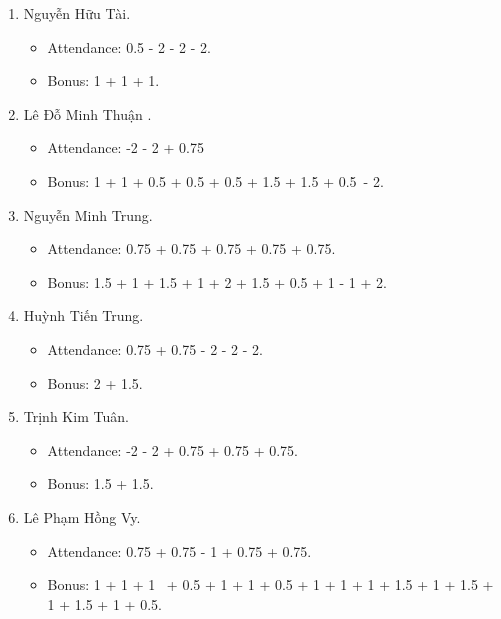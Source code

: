 \documentclass{article}
\begin{document}
\begin{enumerate}
\begin{itemize}
        \item Bonus: 0.5 + 0.5 + 0.5 + 1 + 1.5 + 1.5.
    \end{itemize}
    \item {\sc Nguyễn Hữu Tài.}
    \begin{itemize}
        \item Attendance: 0.5 - 2 - 2 - 2.
        \item Bonus: 1 + 1 + 1.
    \end{itemize}
    \item {\sc Lê Đỗ Minh Thuận .}
    \begin{itemize}
        \item Attendance: -2 - 2 + 0.75
        \item Bonus: 1 + 1 + 0.5 + 0.5 + 0.5 + 1.5 + 1.5 + 0.5 - 2.
    \end{itemize}
    \item {\sc Nguyễn Minh Trung.}
    \begin{itemize}
        \item Attendance: 0.75 + 0.75  + 0.75 + 0.75 + 0.75.
        \item Bonus: 1.5 + 1 + 1.5 + 1 + 2 + 1.5 + 0.5 + 1 - 1 + 2.
    \end{itemize}
    \item {\sc Huỳnh Tiến Trung.}
    \begin{itemize}
        \item Attendance: 0.75 + 0.75 - 2 - 2 - 2.
        \item Bonus: 2 + 1.5.
    \end{itemize}
    \item {\sc Trịnh Kim Tuân.}
    \begin{itemize}
        \item Attendance: -2 - 2 + 0.75 + 0.75 + 0.75.
        \item Bonus: 1.5 + 1.5.
    \end{itemize}
    \item {\sc Lê Phạm Hồng Vy.}
    \begin{itemize}
        \item Attendance: 0.75 + 0.75 - 1 + 0.75 + 0.75.
        \item Bonus: 1 + 1 + 1  + 0.5 + 1 + 1 + 0.5 + 1 + 1 + 1 + 1.5 + 1 + 1.5 + 1 + 1.5 + 1 + 0.5.
    \end{itemize}
\end{enumerate}

\end{document}
